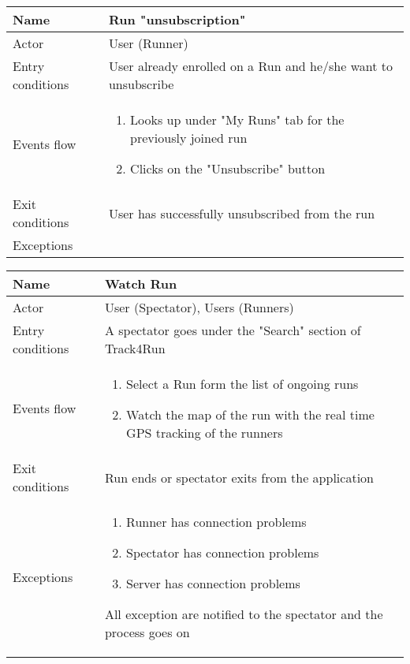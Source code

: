\begin{table}[h!]
\begin{tabular}{|l|p{12cm}|}
\hline
Name             & Run "unsubscription" \\ \hline
Actor            & User (Runner) \\ \hline
Entry conditions & User already enrolled on a Run and he/she want to unsubscribe \\ \hline
Events flow      & \begin{enumerate}
\item Looks up under "My Runs" tab for the previously joined run
\item Clicks on the "Unsubscribe" button
\end{enumerate} \\ \hline
Exit conditions  & User has successfully unsubscribed from the run \\ \hline
Exceptions       & \\ \hline
\end{tabular}
\end{table}

\begin{table}[h!]
\begin{tabular}{|l|p{12cm}|}
\hline
Name             & Watch Run \\ \hline
Actor            & User (Spectator), Users (Runners) \\ \hline
Entry conditions & A spectator goes under the "Search" section of Track4Run  \\ \hline
Events flow      & \begin{enumerate}
\item Select a Run form the list of ongoing runs
\item Watch the map of the run with the real time GPS tracking of the runners
\end{enumerate} \\ \hline
Exit conditions  & Run ends or spectator exits from the application \\ \hline
Exceptions       & \begin{enumerate}
\item Runner has connection problems
\item Spectator has connection problems
\item Server has connection problems
\end{enumerate} All exception are notified to the spectator and the process goes on\\ \hline
\end{tabular}
\end{table}

